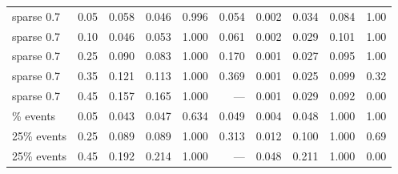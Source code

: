 \begin{table}[htbp]
\begin{tabular}{llrrrrrrrr}
\addlinespace
sparse 0.7 & 0.05 & 0.058 & 0.046 & 0.996 & 0.054 & 0.002 & 0.034 & 0.084 & 1.00 \\
sparse 0.7 & 0.10 & 0.046 & 0.053 & 1.000 & 0.061 & 0.002 & 0.029 & 0.101 & 1.00 \\
sparse 0.7 & 0.25 & 0.090 & 0.083 & 1.000 & 0.170 & 0.001 & 0.027 & 0.095 & 1.00 \\
sparse 0.7 & 0.35 & 0.121 & 0.113 & 1.000 & 0.369 & 0.001 & 0.025 & 0.099 & 0.32 \\
sparse 0.7 & 0.45 & 0.157 & 0.165 & 1.000 & --- & 0.001 & 0.029 & 0.092 & 0.00 \\
\addlinespace
25\% events & 0.05 & 0.043 & 0.047 & 0.634 & 0.049 & 0.004 & 0.048 & 1.000 & 1.00 \\
25\% events & 0.25 & 0.089 & 0.089 & 1.000 & 0.313 & 0.012 & 0.100 & 1.000 & 0.69 \\
25\% events & 0.45 & 0.192 & 0.214 & 1.000 & --- & 0.048 & 0.211 & 1.000 & 0.00 \\
\bottomrule
\end{tabular}
\end{table}

